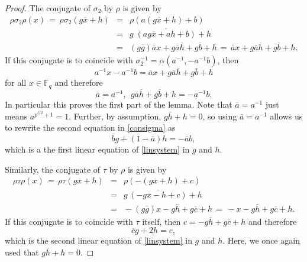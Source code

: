 \documentclass[12pt]{article}
\theoremstyle{definition}\newtheorem{definition}{Definition}[section]
\begin{document}
\begin{proof}
The conjugate of $\sigma_2$ by $\rho$ is given by
\begin{equation}
\label{conjrho2}
\begin{array}{rcl}
\rho\sigma_2\rho(x)\,=\,\rho\sigma_2 (g\overline{x}+h)\!\!&=&\!\!\rho(a(g\overline{x}+h)+b)\\[.03in]
\!\!&=&\!\!g\;\overline{(ag\overline{x}+ah+b)}+h \\[.03in]
&=&\!\! (g\overline{g})\overline{a}x+g\overline{a}\overline{h}+g\overline{b} +h
\,=\,\overline{a}x+g\overline{a}\overline{h}+g\overline{b} +h.
\end{array} 
\end{equation}
If this conjugate is to coincide with $\sigma_2^{-1}=\alpha(a^{-1},-a^{-1}b)$, then 
\[a^{-1}x-a^{-1}b = \overline{a}x+g\overline{a}\overline{h}+g\overline{b} +h\]
for all $x\in\mathbb{F}_q$ and therefore
\begin{equation}
\label{consigma}
\overline{a}=a^{-1},\;\, g\overline{a}\overline{h}+g\overline{b} +h=-a^{-1}b.
\end{equation}
In particular this proves the first part of the lemma. Note that $\overline{a}=a^{-1}$ just means $a^{p^{l/2} +1}=1$. Further, by assumption, $g\overline{h}+h=0$, so using $\overline{a}=a^{-1}$ allows us to rewrite the second equation in \eqref{consigma} as 
\begin{equation}
\label{chireq1}
\overline{b}g +(1-\overline{a})h=-\overline{a}b,
\end{equation}
which is a the first linear equation of \eqref{linsystem} in $g$ and $h$.

Similarly, the conjugate of $\tau$ by $\rho$ is given by
\begin{equation}
\label{conjtau}
\begin{array}{rcl}
\rho\tau\rho(x)\,=\,\rho\tau(g\overline{x}+h)\!\!&=&\!\!\rho(-(g\overline{x}+h)+c)\\[.03in]
\!\!&=&\!\! g\,\overline{(-g\overline{x}-h+c)}+h \\[.03in]
&=&\!\!-(g\overline{g})x-\!g\overline{h}+g\overline{c} +h
\,=\,-x-g\overline{h}+g\overline{c} +h.
\end{array} 
\end{equation}
If this conjugate is to coincide with $\tau$ itself, then $c=-g\overline{h}+g\overline{c} +h$ and therefore 
\begin{equation}
\label{chireq2}
\overline{c}g + 2h = c,
\end{equation}
which is the second linear equation of \eqref{linsystem} in $g$ and $h$. Here, we once again used that $g\overline{h}+h=0$. 


\end{proof}
\end{document}
